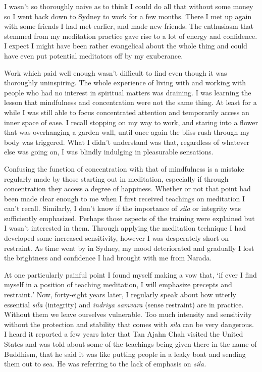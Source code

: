 I wasn't so thoroughly naive as to think I could do all that without
some money so I went back down to Sydney to work for a few months. There
I met up again with some friends I had met earlier, and made new
friends. The enthusiasm that stemmed from my meditation practice gave
rise to a lot of energy and confidence. I expect I might have been
rather evangelical about the whole thing and could have even put
potential meditators off by my exuberance.

Work which paid well enough wasn't difficult to find even though it was
thoroughly uninspiring. The whole experience of living with and working
with people who had no interest in spiritual matters was draining. I was
learning the lesson that mindfulness and concentration were not the same
thing. At least for a while I was still able to focus concentrated
attention and temporarily access an inner space of ease. I recall
stopping on my way to work, and staring into a flower that was
overhanging a garden wall, until once again the bliss-rush through my
body was triggered. What I didn't understand was that, regardless of
whatever else was going on, I was blindly indulging in pleasurable
sensations.

Confusing the function of concentration with that of mindfulness is a
mistake regularly made by those starting out in meditation, especially
if through concentration they access a degree of happiness. Whether or
not that point had been made clear enough to me when I first received
teachings on meditation I can't recall. Similarly, I don't know if the
importance of \emph{sila} or integrity was sufficiently emphasized.
Perhaps those aspects of the training were explained but I wasn't
interested in them. Through applying the meditation technique I had
developed some increased sensitivity, however I was desperately short on
restraint. As time went by in Sydney, my mood deteriorated and gradually
I lost the brightness and confidence I had brought with me from Narada.

At one particularly painful point I found myself making a vow that, `if
ever I find myself in a position of teaching meditation, I will
emphasize precepts and restraint\emph{.}' Now, forty-eight years later,
I regularly speak about how utterly essential \emph{sila} (integrity)
and \emph{indriya samvara} (sense restraint) are in practice. Without
them we leave ourselves vulnerable. Too much intensity and sensitivity
without the protection and stability that comes with \emph{sila} can be
very dangerous. I heard it reported a few years later that Tan Ajahn
Chah visited the United States and was told about some of the teachings
being given there in the name of Buddhism, that he said it was like
putting people in a leaky boat and sending them out to sea. He was
referring to the lack of emphasis on \emph{sila.}

